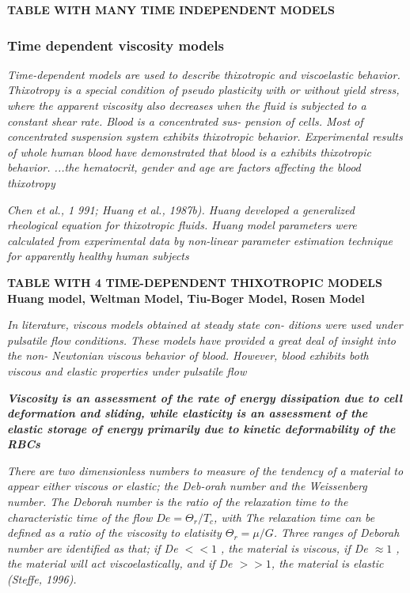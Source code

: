 \documentclass[11pt,letterpaper]{article}
\begin{document}
\textbf{TABLE WITH MANY TIME INDEPENDENT MODELS}


\subsubsection*{Time dependent viscosity  models}
\textit{Time-dependent models are used to describe  thixotropic
and  viscoelastic behavior. Thixotropy  is  a special condition of pseudo plasticity with or without yield stress, where the apparent viscosity also decreases when the fluid is subjected to a constant  shear rate. 
 Blood is a  concentrated sus- pension of cells.  Most  of concentrated suspension system exhibits thixotropic behavior. Experimental results of whole human blood  have  demonstrated that blood is a exhibits thixotropic behavior. ...the hematocrit, gender and age  are factors  affecting  the blood thixotropy}
 
 \textit{Chen  et al., 1 991;  Huang  et al., 1987b). Huang developed a generalized  rheological equation for thixotropic fluids. Huang model parameters were calculated from experimental data by non-linear parameter estimation technique for  apparently healthy  human subjects}

\textbf{TABLE WITH 4 TIME-DEPENDENT THIXOTROPIC MODELS}\newline
{\color{red}\textbf{Huang model, Weltman Model, Tiu-Boger Model, Rosen Model }}


\textit{In literature, viscous models obtained at steady state  con- ditions were used under pulsatile flow conditions. These models have  provided  a great deal  of insight  into the  non- Newtonian viscous behavior of blood. However,  blood exhibits both viscous and elastic  properties under pulsatile flow }

\textbf{\textit{Viscosity  is  an assessment  of the rate of energy dissipation due to cell deformation and sliding, while elasticity is an assessment of  the elastic  storage of  energy  primarily due to kinetic deformability of the RBCs}}


\textit{There are  two dimensionless numbers to measure of the tendency of a material to  appear either viscous or  elastic; the  Deb-orah number and the  Weissenberg number. The Deborah number is the  ratio of the relaxation time to  the characteristic time of the flow $De= \Theta_r/ T_c$, with The relaxation time can  be defined as  a ratio of the viscosity to elatisity $\Theta_r=\mu/G$. Three ranges  of Deborah  number  are  identified as that; if
De $<<1$ ,  the material is  viscous, if De $\approx1$ ,  the material will act viscoelastically, and if De $>>1$, the material is elastic (Steffe, 1996).}
\end{document}
